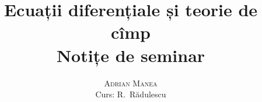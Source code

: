 \documentclass[12pt, a4paper]{book}
\begin{document}
\thispagestyle{empty}
\pagestyle{plain} %

\title{\huge\textbf{Ecuații diferențiale și teorie de cîmp} \\ \Large{Notițe de seminar}}
\vspace{1cm}
\author{\Large\textsc{Adrian Manea} \\ \large{Curs: R.\ Rădulescu}}

\maketitle

\tableofcontents

\setcounter{page}{1} %


\renewcommand{\indexname}{Index}
\printindex
\end{document}
